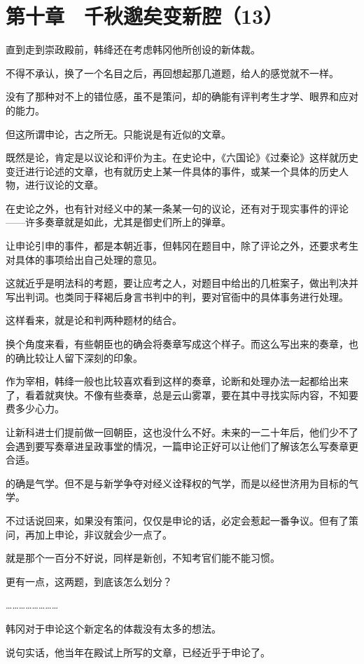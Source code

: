\section{第十章　千秋邈矣变新腔（13）}

直到走到崇政殿前，韩绛还在考虑韩冈他所创设的新体裁。

不得不承认，换了一个名目之后，再回想起那几道题，给人的感觉就不一样。

没有了那种对不上的错位感，虽不是策问，却的确能有评判考生才学、眼界和应对的能力。

但这所谓申论，古之所无。只能说是有近似的文章。

既然是论，肯定是以议论和评价为主。在史论中，《六国论》《过秦论》这样就历史变迁进行论述的文章，也有就历史上某一件具体的事件，或某一个具体的历史人物，进行议论的文章。

在史论之外，也有针对经义中的某一条某一句的议论，还有对于现实事件的评论——许多奏章就是如此，尤其是御史们所上的弹章。

让申论引申的事件，都是本朝近事，但韩冈在题目中，除了评论之外，还要求考生对具体的事项给出自己处理的意见。

这就近乎是明法科的考题，要让应考之人，对题目中给出的几桩案子，做出判决并写出判词。也类同于释褐后身言书判中的判，要对官衙中的具体事务进行处理。

这样看来，就是论和判两种题材的结合。

换个角度来看，有些朝臣也的确会将奏章写成这个样子。而这么写出来的奏章，也的确比较让人留下深刻的印象。

作为宰相，韩绛一般也比较喜欢看到这样的奏章，论断和处理办法一起都给出来了，看着就爽快。不像有些奏章，总是云山雾罩，要在其中寻找实际内容，不知要费多少心力。

让新科进士们提前做一回朝臣，这也没什么不好。未来的一二十年后，他们少不了会遇到要写奏章进呈政事堂的情况，一篇申论正好可以让他们了解该怎么写奏章更合适。

的确是气学。但不是与新学争夺对经义诠释权的气学，而是以经世济用为目标的气学。

不过话说回来，如果没有策问，仅仅是申论的话，必定会惹起一番争议。但有了策问，再加上申论，非议就会少一点了。

就是那个一百分不好说，同样是新创，不知考官们能不能习惯。

更有一点，这两题，到底该怎么划分？

……………………

韩冈对于申论这个新定名的体裁没有太多的想法。

说句实话，他当年在殿试上所写的文章，已经近乎于申论了。

